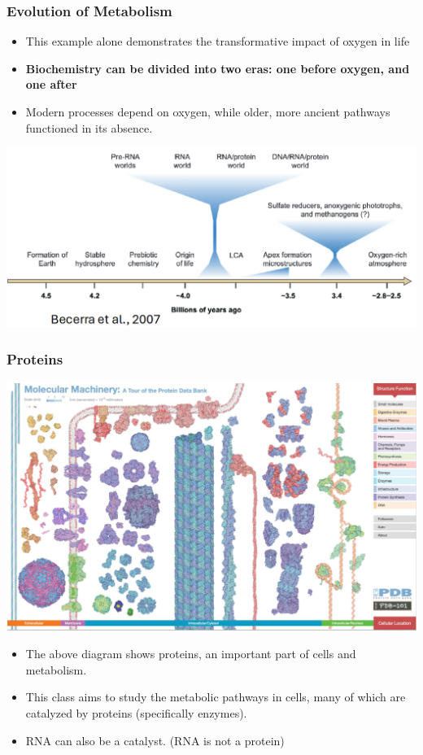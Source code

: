 \documentclass[10pt]{article}
\begin{document}
\subsubsection*{Evolution of Metabolism}
\begin{itemize}
    \item This example alone demonstrates the transformative impact of oxygen in life
    \item \textbf{Biochemistry can be divided into two eras: one before oxygen, and one after}
    \item Modern processes depend on oxygen, while older, more ancient pathways functioned in its absence.
\end{itemize}
\begin{center}
    \includegraphics*[width=\textwidth]{L1_4.png}
\end{center}
\subsubsection*{Proteins}
\begin{center}
    \includegraphics*[width=\textwidth]{L1_5.png}
\end{center}
\begin{itemize}
    \item The above diagram shows proteins, an important part of cells and metabolism.
    \item This class aims to study the metabolic pathways in cells, many of which are catalyzed by proteins (specifically enzymes).
    \item RNA can also be a catalyst.  (RNA is not a protein)
\end{itemize}
\end{document}
